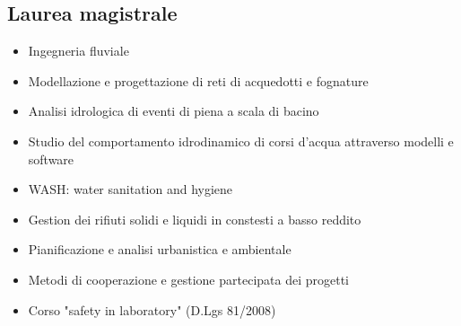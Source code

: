 \documentclass[12pt,a4paper,sans]{moderncv} %
\begin{document}
\subsection{Laurea magistrale}
\begin{itemize}
\item Ingegneria fluviale
\item Modellazione e progettazione di reti di acquedotti e fognature
\item Analisi idrologica di eventi di piena a scala di bacino
\item Studio del comportamento idrodinamico di corsi d'acqua attraverso modelli e software
\item WASH: water sanitation and hygiene
\item Gestion dei rifiuti solidi e liquidi in constesti a basso reddito
\item Pianificazione e analisi urbanistica e ambientale
\item Metodi di cooperazione e gestione partecipata dei progetti
\item Corso "safety in laboratory" (D.Lgs 81/2008)
\end{itemize}
\medskip
\end{document}
